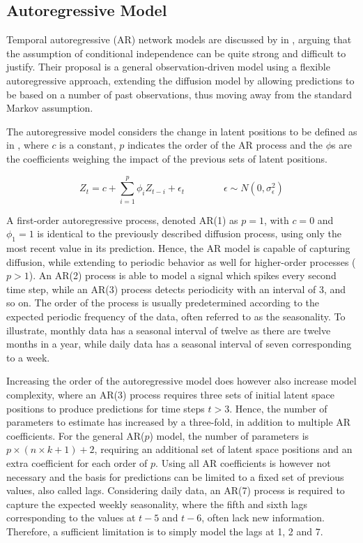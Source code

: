     
    \subsection{Autoregressive Model}
    
        Temporal autoregressive (AR) network models are discussed by \citeauthor{sewell2018simultaneous} in \cite{sewell2018simultaneous}, arguing that the assumption of conditional independence can be quite strong and difficult to justify. Their proposal is a general observation-driven model using a flexible autoregressive approach, extending the diffusion model by allowing predictions to be based on a number of past observations, thus moving away from the standard Markov assumption. 
        
        The autoregressive model considers the change in latent positions to be defined as in , where $c$ is a constant, $p$ indicates the order of the AR process and the $\phi$s are the coefficients weighing the impact of the previous sets of latent positions.
        
        \begin{equation}\label{eq:ar-model}
            Z_t = c + \sum_{i=1}^p \phi_i Z_{t-i} + \epsilon_t \qquad\qquad \epsilon \sim N(0,\sigma_\epsilon^2)
        \end{equation}
        
        A first-order autoregressive process, denoted AR(1) as $p=1$, with $c=0$ and $\phi_1=1$ is identical to the previously described diffusion process, using only the most recent value in its prediction. Hence, the AR model is capable of capturing diffusion, while extending to periodic behavior as well for higher-order processes ($p>1$). An AR(2) process is able to model a signal which spikes every second time step, while an AR(3) process detects periodicity with an interval of 3, and so on. The order of the process is usually predetermined according to the expected periodic frequency of the data, often referred to as the seasonality. To illustrate, monthly data has a seasonal interval of twelve as there are twelve months in a year, while daily data has a seasonal interval of seven corresponding to a week.
        
        Increasing the order of the autoregressive model does however also increase model complexity, where an AR(3) process requires three sets of initial latent space positions to produce predictions for time steps $t>3$. Hence, the number of parameters to estimate has increased by a three-fold, in addition to multiple AR coefficients. For the general AR($p$) model, the number of parameters is $p\times (n\times k + 1) + 2$, requiring an additional set of latent space positions and an extra coefficient for each order of $p$.
        Using all AR coefficients is however not necessary and the basis for predictions can be limited to a fixed set of previous values, also called lags. Considering daily data, an AR(7) process is required to capture the expected weekly seasonality, where the fifth and sixth lags corresponding to the values at $t-5$ and $t-6$, often lack new information. Therefore, a sufficient limitation is to simply model the lags at 1, 2 and 7.
        
